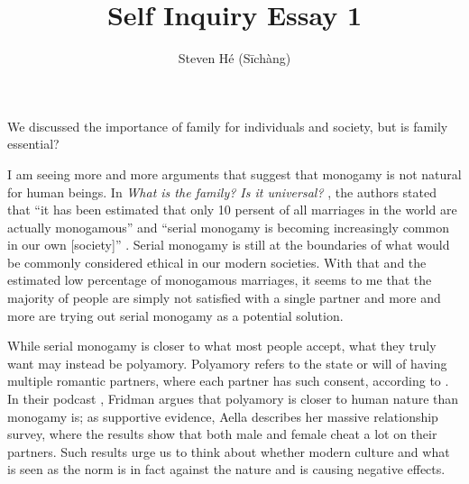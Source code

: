 \documentclass[12pt]{article}
\title{Self Inquiry Essay 1}
\author{Steven Hé (Sīchàng)}
\begin{document}
\maketitle
We discussed the importance of family for individuals and society,
but is family essential?

I am seeing more and more arguments that suggest that monogamy is not natural
for human beings.
In \textit{What is the family? Is it universal?} \citep{gittins1993family},
the authors stated that ``it has been estimated that only 10 persent of all
marriages in the world are actually monogamous'' and
``serial monogamy is becoming increasingly common in our own [society]''
\citep{gittins1993family}.
Serial monogamy is still at the boundaries of what would be commonly considered
ethical in our modern societies.
With that and the estimated low percentage of monogamous marriages,
it seems to me that the majority of people are simply not satisfied with a
single partner and
more and more are trying out serial monogamy as a potential solution.

While serial monogamy is closer to what most people accept,
what they truly want may instead be polyamory.
Polyamory refers to the state or will of having multiple romantic partners,
where each partner has such consent, according to \cite{wikipedia2023polyamory}.
In their podcast \citep{fridman2023aella},
Fridman argues that polyamory is closer to human nature than monogamy is;
as supportive evidence, Aella describes her massive relationship survey,
where the results show that both male and female cheat a lot on their partners.
Such results urge us to think about whether modern culture and what is seen as
the norm is in fact against the nature and is causing negative effects.
\pagebreak

\begin{raggedright}

\end{raggedright}
\end{document}
